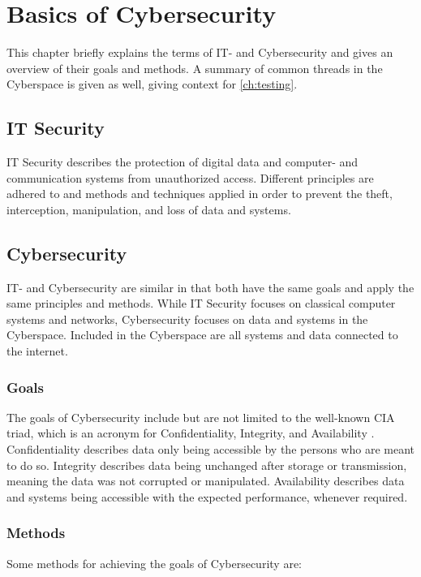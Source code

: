 \chapter{Basics of Cybersecurity}\label{ch:basics_cybersec}
This chapter briefly explains the terms of IT- and Cybersecurity and gives an overview of their goals and methods.
A summary of common threads in the Cyberspace is given as well, giving context for \cref{ch:testing}.

\section{IT Security}
IT Security describes the protection of digital data and computer- and communication systems from unauthorized access.
Different principles are adhered to and methods and techniques applied in order to prevent the theft, interception, manipulation, and loss of data and systems. \cite{IT_Basiswissen}

\section{Cybersecurity}
IT- and Cybersecurity are similar in that both have the same goals and apply the same principles and methods.
While IT Security focuses on classical computer systems and networks, Cybersecurity focuses on data and systems in the Cyberspace.
Included in the Cyberspace are all systems and data connected to the internet.

\subsection{Goals}
The goals of Cybersecurity include but are not limited to the well-known CIA triad, which is an acronym for Confidentiality, Integrity, and Availability \cite{Oriyano_2017}.
Confidentiality describes data only being accessible by the persons who are meant to do so.
Integrity describes data being unchanged after storage or transmission, meaning the data was not corrupted or manipulated.
Availability describes data and systems being accessible with the expected performance, whenever required. 

\subsection{Methods}\label{ssec:cs_methods}
Some methods for achieving the goals of Cybersecurity are:

